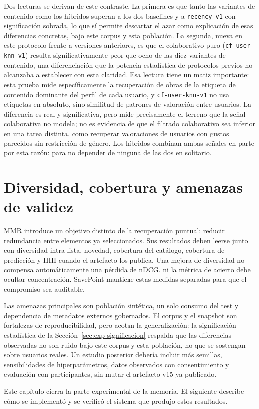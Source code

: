 Dos lecturas se derivan de este contraste. La primera es que tanto las variantes de contenido
como los híbridos superan a los dos baselines y a \texttt{recency-v1} con significación
sobrada, lo que sí permite descartar el azar como explicación de esas diferencias concretas,
bajo este corpus y esta población. La segunda, nueva en este protocolo frente a versiones
anteriores, es que el colaborativo puro (\texttt{cf-user-knn-v1}) resulta significativamente
peor que ocho de las diez variantes de contenido, una diferenciación que la potencia
estadística de protocolos previos no alcanzaba a establecer con esta claridad. Esa lectura
tiene un matiz importante: esta prueba mide específicamente la recuperación de obras de la
etiqueta de contenido dominante del perfil de cada usuario, y \texttt{cf-user-knn-v1} no usa
etiquetas en absoluto, sino similitud de patrones de valoración entre usuarios. La diferencia
es real y significativa, pero mide precisamente el terreno que la señal colaborativa no
modela; no es evidencia de que el filtrado colaborativo sea inferior en una tarea distinta,
como recuperar valoraciones de usuarios con gustos parecidos sin restricción de género. Los
híbridos combinan ambas señales en parte por esta razón: para no depender de ninguna de las
dos en solitario.

\section{Diversidad, cobertura y amenazas de validez}\label{sec:exp-amenazas}

MMR introduce un objetivo distinto de la recuperación puntual: reducir redundancia entre elementos ya seleccionados. Sus resultados deben leerse junto con diversidad intra-lista, novedad, cobertura del catálogo, cobertura de predicción y HHI cuando el artefacto los publica. Una mejora de diversidad no compensa automáticamente una pérdida de nDCG, ni la métrica de acierto debe ocultar concentración. SavePoint mantiene estas medidas separadas para que el compromiso sea auditable.

Las amenazas principales son población sintética, un solo consumo del test y dependencia de
metadatos externos gobernados. El corpus y el snapshot son fortalezas de reproducibilidad,
pero acotan la generalización: la significación estadística de la Sección~\ref{sec:exp-significacion}
respalda que las diferencias observadas no son ruido bajo este corpus y esta población, no
que se sostengan sobre usuarios reales. Un estudio posterior debería incluir más semillas,
sensibilidades de hiperparámetros, datos observados con consentimiento y evaluación con
participantes, sin mutar el artefacto v15 ya publicado.

Este capítulo cierra la parte experimental de la memoria. El siguiente describe cómo se implementó y se verificó el sistema que produjo estos resultados.
